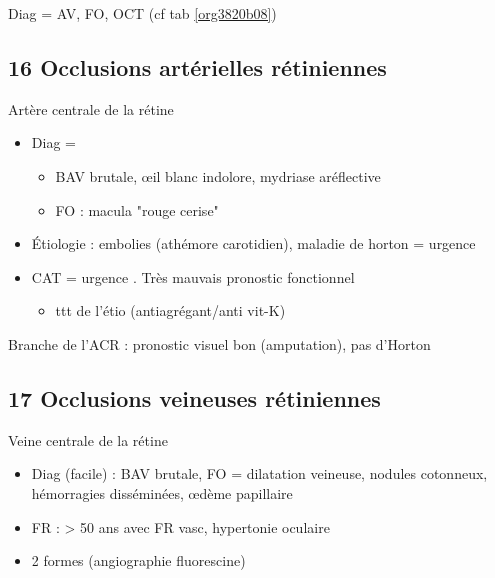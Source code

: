 \documentclass[11pt]{article}
\begin{document}
Diag = AV, FO, OCT (cf tab \ref{org3820b08})
\begin{table}
\caption{Formes de DMLA}
\centering
{}
\label{org3820b08}
\end{table}
\subsection{16 Occlusions artérielles rétiniennes}
\label{sec:orge37a53f}
Artère centrale de la rétine 
\begin{itemize}
\item Diag = 
\begin{itemize}
\item BAV brutale, \oe{}il blanc indolore, mydriase aréflective
\item FO : macula "rouge cerise"
\end{itemize}
\item Étiologie : embolies (athémore carotidien), maladie de horton = urgence \faBomb
\item CAT = urgence \faBomb. Très mauvais pronostic fonctionnel
\begin{itemize}
\item ttt de l'étio (antiagrégant/anti vit-K)
\end{itemize}
\end{itemize}
Branche de l'ACR : pronostic visuel bon (amputation), pas d'Horton
\subsection{17 Occlusions veineuses rétiniennes}
\label{sec:org194aeea}
Veine centrale de la rétine
\begin{itemize}
\item Diag (facile) : BAV brutale, FO = dilatation veineuse, nodules cotonneux,
hémorragies disséminées, \oe{}dème papillaire
\item FR : > 50 ans avec FR vasc, hypertonie oculaire
\item 2 formes (angiographie fluorescine)
\end{itemize}
\end{document}
